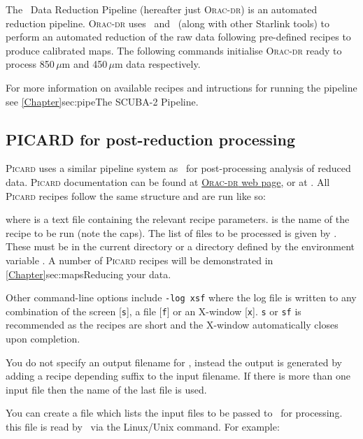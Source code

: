 The \oracdr\ Data Reduction Pipeline \cite{oracdr} (hereafter just
\textsc{Orac-dr}) is an automated reduction pipeline. \textsc{Orac-dr}
uses \smurf\ and \Kappa\ (along with other Starlink tools) to perform
an automated reduction of the raw data following pre-defined recipes
to produce calibrated maps.  The following commands initialise
\textsc{Orac-dr} ready to process 850\,$\mu$m and 450\,$\mu$m data
respectively.
\begin{terminalv}
\end{terminalv}
For more information on available recipes and intructions for running the pipeline
see \cref{Chapter}{sec:pipe}{The SCUBA-2 Pipeline}.

\subsection{PICARD for post-reduction processing}

\textsc{Picard} uses a similar pipeline system as \oracdr\ for
post-processing analysis of reduced data. \textsc{Picard}
documentation can be found at
\href{http://www.oracdr.org/oracdr/PICARD}{\textsc{Orac-dr} web page},
or at \picardsun. All \textsc{Picard} recipes follow the same
structure and are run like so:
\begin{terminalv}
\end{terminalv}
where  is a text file containing the
relevant recipe parameters.  is the name of the recipe
to be run (note the caps). The list of files to be processed is given
by  . These must be in the current directory or a
directory defined by the environment variable . A
number of \textsc{Picard} recipes will be demonstrated in
\cref{Chapter}{sec:maps}{Reducing your data}.

Other command-line options include \texttt{-log xsf} where the log
file is written to any combination of the screen [\texttt{s}], a file
[\texttt{f}] or an X-window [\texttt{x}]. \texttt{s} or \texttt{sf} is
recommended as the recipes are short and the X-window automatically
closes upon completion.

You do not specify an output filename for \picard, instead the output
is generated by adding a recipe depending suffix to the input
filename. If there is more than one input file then the name of the
last file is used.

You can create a file which lists the input files to be passed to
\picard\ for processing. this file is read by \picard\ via the
Linux/Unix  command. For example:

